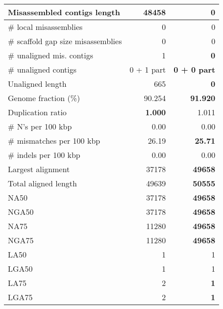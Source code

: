 \documentclass[12pt,a4paper]{article}
\begin{document}
\begin{table}[ht]
\begin{center}
\begin{tabular}{|l*{2}{|r}|}
Misassembled contigs length & 48458 & {\bf 0} \\ \hline
\# local misassemblies & 0 & 0 \\ \hline
\# scaffold gap size misassemblies & 0 & 0 \\ \hline
\# unaligned mis. contigs & 1 & {\bf 0} \\ \hline
\# unaligned contigs & 0 + 1 part & {\bf 0 + 0 part} \\ \hline
Unaligned length & 665 & {\bf 0} \\ \hline
Genome fraction (\%) & 90.254 & {\bf 91.920} \\ \hline
Duplication ratio & {\bf 1.000} & 1.011 \\ \hline
\# N's per 100 kbp & 0.00 & 0.00 \\ \hline
\# mismatches per 100 kbp & 26.19 & {\bf 25.71} \\ \hline
\# indels per 100 kbp & 0.00 & 0.00 \\ \hline
Largest alignment & 37178 & {\bf 49658} \\ \hline
Total aligned length & 49639 & {\bf 50555} \\ \hline
NA50 & 37178 & {\bf 49658} \\ \hline
NGA50 & 37178 & {\bf 49658} \\ \hline
NA75 & 11280 & {\bf 49658} \\ \hline
NGA75 & 11280 & {\bf 49658} \\ \hline
LA50 & 1 & 1 \\ \hline
LGA50 & 1 & 1 \\ \hline
LA75 & 2 & {\bf 1} \\ \hline
LGA75 & 2 & {\bf 1} \\ \hline
\end{tabular}
\end{center}
\end{table}
\end{document}
